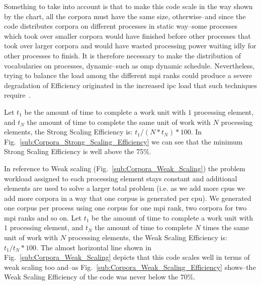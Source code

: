 {Something to take into account is that to make this code scale in the way shown by the chart, all the corpora must have the same size, otherwise--and since the code distributes corpora on different processes in static way--some processes which took over smaller corpora would have finished before other processes that took over larger corpora and would have wasted processing power waiting idly for other processes to finish. It is therefore necessary to make the distribution of vocabularies on processes, dynamic--such as \gls{omp} dynamic schedule. Nevertheless, trying to balance the load among the different \gls{mpi} ranks could produce a severe degradation of Efficiency originated in the increased \gls{ipc} load that such techniques require~\cite{hu2012biophysically}.

Let $t_1$ be the amount of time to complete a work unit with $1$ processing element, and $t_N$ the amount of time to complete the same unit of work with $N$ processing elements, the Strong Scaling Efficiency is: $t_1 / (N * t_N) * 100$. In Fig.~\ref{sub:Corpora_Strong_Scaling_Efficiency} we can see that the minimum Strong Scaling Efficiency is well above the 75\%.

In reference to Weak scaling (Fig.~\ref{sub:Corpora_Weak_Scaling}) the problem workload assigned to each processing element stays constant and additional elements are used to solve a larger total problem (i.e. as we add more \glspl{cpu} we add more corpora in a way that one corpus is generated per \gls{cpu}). We generated one corpus per process using one corpus for one \gls{mpi} rank, two corpora for two \gls{mpi} ranks and so on. Let $t_1$ be the amount of time to complete a work unit with $1$ processing element, and $t_N$ the amount of time to complete $N$ times the same unit of work with $N$ processing elements, the Weak Scaling Efficiency is: $t_1 / t_N * 100$. The almost horizontal line shown in Fig.~\ref{sub:Corpora_Weak_Scaling} depicts that this code scales well in terms of weak scaling too and--as Fig.~\ref{sub:Corpora_Weak_Scaling_Efficiency} shows--the Weak Scaling Efficiency of the code was never below the 70\%.
}











